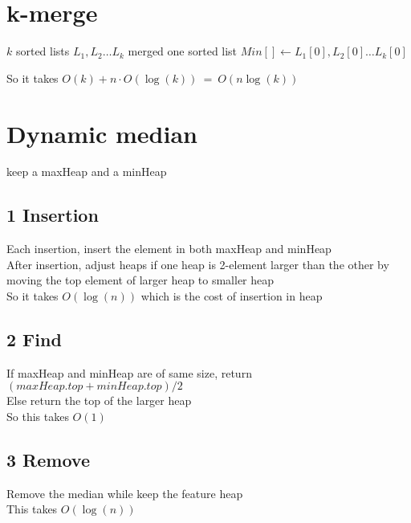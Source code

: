 \documentclass[a4paper]{article}
\begin{document}
\begin{spacing}{1.3}
\section*{k-merge}
\begin{algorithmic}[1]
\Require $k$ sorted lists $L_1,L_2\ldots L_k$
\Ensure merged one sorted list
\State $Min[] \gets L_1[0],L_2[0]\ldots L_k[0]$ 
\State {} 
\State {}
\State {} 
\EndWhile
\end{algorithmic}
So it takes $O(k)+n\cdot O(\log(k))\ =\ O(n\log(k))$ 

\section*{Dynamic median}
keep a maxHeap and a minHeap
\subsection*{1 Insertion}
Each insertion, insert the element in both maxHeap and minHeap
\\After insertion, adjust heaps if one heap is 2-element larger than the other by moving the top element of larger heap to smaller heap
\\So it takes $O(\log(n))$ which is the cost of insertion in heap
\subsection*{2 Find}
If maxHeap and minHeap are of same size, return $(maxHeap.top+minHeap.top)/2$
\\Else return the top of the larger heap
\\So this takes $O(1)$ 
\subsection*{3 Remove}
Remove the median while keep the feature heap
\\This takes $O(\log(n))$
\end{spacing}
\end{document}
